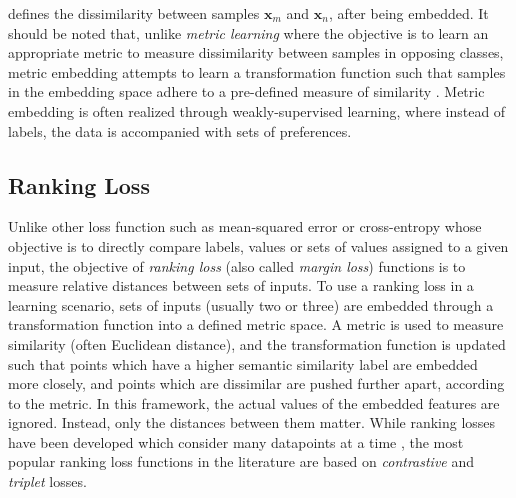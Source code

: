 defines the dissimilarity between samples $\bm{x}_{m}$ and $\bm{x}_{n}$, after being embedded.  It should be noted that, unlike \textit{metric learning} where the objective is to learn an appropriate metric to measure dissimilarity between samples in opposing classes, metric embedding attempts to learn a transformation function such that samples in the embedding space adhere to a pre-defined measure of similarity \citep{Hermans2017DefenseTripletLoss}.  Metric embedding is often realized through weakly-supervised learning, where instead of labels, the data is accompanied with sets of preferences.

	\subsection{Ranking Loss}
	Unlike other loss function such as mean-squared error or cross-entropy whose objective is to directly compare labels, values or sets of values assigned to a given input, the objective of \textit{ranking loss} (also called \textit{margin loss}) functions is to measure relative distances between sets of inputs.  To use a ranking loss in a learning scenario, sets of inputs (usually two or three) are embedded through a transformation function into a defined metric space.  A metric is used to measure similarity (often Euclidean distance), and the transformation function is updated such that points which have a higher semantic similarity label are embedded more closely, and points which are dissimilar are pushed further apart, according to the metric.  In this framework, the actual values of the embedded features are ignored.  Instead, only the distances between them matter.  While ranking losses have been developed which consider many datapoints at a time \citep{Sohn2016NPairLoss}, the most popular ranking loss functions in the literature are based on \textit{contrastive} \citep{Koch2015SiameseNetworks} and \textit{triplet} \citep{Schroff2015FaceNet} losses.
	
